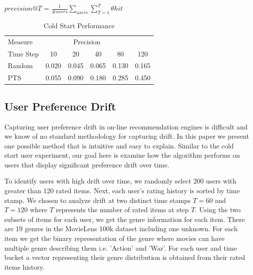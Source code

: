 \documentclass{article}
\begin{document}
\begin{center}
$precision@T$ = $\frac{1}{\#users}\sum\limits_{users}\sum\limits_{T=1}^{T}\theta hit$
\end{center}

\begin{table}[ht]
\caption{Cold Start Performance}
\label{sample-table}
\vskip 0.15in
\begin{center}
\begin{small}
\begin{sc}
\begin{tabular}{lccccc}
\toprule
Measure & \multicolumn{4}{c}{Precision}\\
Time Step  & 10     & 20     & 40   & 80    & 120 \\
\midrule
Random  &  0.020 & 0.045 & 0.065 & 0.130 & 0.165 \\
PTS     &  0.055 & 0.090 & 0.180 & 0.285 & 0.450 \\
\bottomrule
\end{tabular}
\end{sc}
\end{small}
\end{center}
\vskip -0.1in
\end{table}

\subsection{User Preference Drift}

Capturing user preference drift in on-line recommendation engines is difficult and we know of no standard methodology for capturing drift. In this paper we present one possible method that is intuitive and easy to explain. Similar to the cold start user experiment, our goal here is examine how the algorithm performs on users that display significant preference drift over time.  

To identify users with high drift over time, we randomly select 200 users with greater than 120 rated items. Next, each user's rating history is sorted by time stamp. We chosen to analyze drift at two distinct time stamps $T=60$ and $T=120$ where $T$ represents the number of rated items at step $T$. Using the two subsets of items for each user, we get the genre information for each item. There are 19 genres in the MovieLens 100k dataset including one unknown. For each item we get the binary representation of the genre where movies can have multiple genre describing them i.e. 'Action' and 'War'. For each user and time bucket a vector representing their genre distribution is obtained from their rated items history. 
\end{document}
